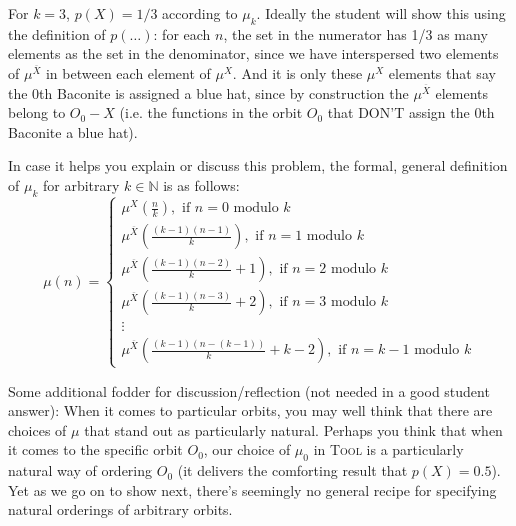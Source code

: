\documentclass[12pt,letterpaper]{article}
\begin{document}
\begin{enumerate}
\begin{enumerate}
{ For $k=3$, $p(X) = 1/3$ according to $\mu_k$. Ideally the student will show this using the definition of $p(\ldots)$: for each $n$, the set in the numerator has 1/3 as many elements as the set in the denominator, since we have interspersed two elements of $\mu^{\overline{X}}$ in between each element of $\mu^X$. And it is only these $\mu^X$ elements that say the 0th Baconite is assigned a blue hat, since by construction the $\mu^{\overline{X}}$ elements belong to $O_0 - X$ (i.e. the functions in the orbit $O_0$ that DON'T assign the 0th Baconite a blue hat). 
 
 In case it helps you explain or discuss this problem, the formal, general definition of $\mu_k$ for arbitrary $k\in \mathbb{N}$ is as follows:
$$
\mu(n) = 
\begin{cases}
\mu^X\left(\frac{n}{k}\right), \text{ if $n = 0$ modulo $k$}\\
\mu^{\overline{X}}\left(\frac{(k-1)(n-1)}{k}\right), \text{ if $n = 1$ modulo $k$}\\
\mu^{\overline{X}}\left(\frac{(k-1)(n-2)}{k}+1\right), \text{ if $n = 2$ modulo $k$}\\
\mu^{\overline{X}}\left(\frac{(k-1)(n-3)}{k}+2\right), \text{ if $n = 3$ modulo $k$}\\
\vdots\\
\mu^{\overline{X}}\left(\frac{(k-1)(n-(k-1))}{k}+k-2\right), \text{ if $n = k-1$ modulo $k$}
\end{cases}
$$

Some additional fodder for discussion/reflection (not needed in a good student answer): When it comes to particular orbits, you may well think that there are choices of $\mu$ that stand out as particularly natural. Perhaps you think that when it comes to the specific orbit $O_0$, our choice of $\mu_0$ in \textsc{Tool} is a particularly natural way of ordering $O_0$ (it delivers the comforting result that  $p(X)=0.5$). Yet as we go on to show next, there's seemingly no general recipe for specifying natural orderings of arbitrary orbits. 
 }
 
 
 \end{enumerate}





\end{enumerate}
\end{document}
